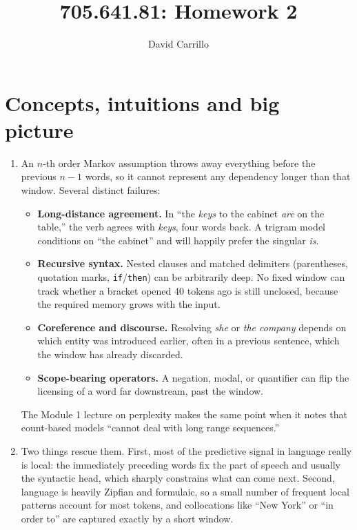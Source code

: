 \documentclass[11pt]{article}
\title{705.641.81: Homework 2}
\author{David Carrillo}
\date{}
\begin{document}
\maketitle

\section{Concepts, intuitions and big picture}

\begin{enumerate}
  \item An $n$-th order Markov assumption throws away everything before the previous $n-1$ words, so it
        cannot represent any dependency longer than that window. Several distinct failures:
        \begin{itemize}
          \item \textbf{Long-distance agreement.} In ``the \emph{keys} to the cabinet \emph{are} on the
                table,'' the verb agrees with \emph{keys}, four words back. A trigram model conditions on
                ``the cabinet'' and will happily prefer the singular \emph{is}.
          \item \textbf{Recursive syntax.} Nested clauses and matched delimiters (parentheses, quotation
                marks, \texttt{if}/\texttt{then}) can be arbitrarily deep. No fixed window can track
                whether a bracket opened 40 tokens ago is still unclosed, because the required memory grows
                with the input.
          \item \textbf{Coreference and discourse.} Resolving \emph{she} or \emph{the company} depends on
                which entity was introduced earlier, often in a previous sentence, which the window has
                already discarded.

          \item \textbf{Scope-bearing operators.} A negation, modal, or quantifier can flip the
                licensing of a word far downstream, past the window.
        \end{itemize}
        The Module 1 lecture on perplexity makes the same point when it notes that count-based models
        ``cannot deal with long range sequences.''

  \item Two things rescue them. First, most of the predictive signal in language really is local: the
        immediately preceding words fix the part of speech and usually the syntactic head, which sharply
        constrains what can come next. Second, language is heavily Zipfian and formulaic, so a small number
        of frequent local patterns account for most tokens, and collocations like ``New York'' or ``in order
        to'' are captured exactly by a short window.


\end{enumerate}
\end{document}
